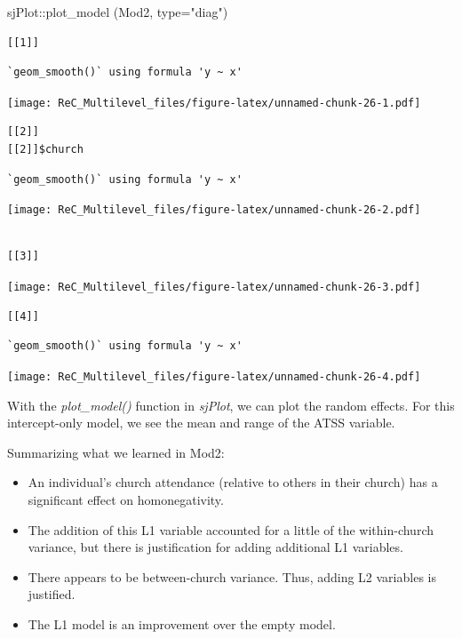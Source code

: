 \documentclass[
  11pt,
]{book}
\newenvironment{Shaded}{\begin{snugshade}}{\end{snugshade}}
\newcommand{\AttributeTok}[1]{\textcolor[rgb]{0.77,0.63,0.00}{#1}}
\newcommand{\FunctionTok}[1]{\textcolor[rgb]{0.00,0.00,0.00}{#1}}
\newcommand{\NormalTok}[1]{#1}
\newcommand{\SpecialCharTok}[1]{\textcolor[rgb]{0.00,0.00,0.00}{#1}}
\newcommand{\StringTok}[1]{\textcolor[rgb]{0.31,0.60,0.02}{#1}}
\providecommand{\tightlist}{%
  \setlength{\itemsep}{0pt}\setlength{\parskip}{0pt}}
\begin{document}
\begin{Shaded}
\begin{Highlighting}[]
\NormalTok{sjPlot}\SpecialCharTok{::}\FunctionTok{plot\_model}\NormalTok{ (Mod2, }\AttributeTok{type=}\StringTok{"diag"}\NormalTok{)}
\end{Highlighting}
\end{Shaded}

\begin{verbatim}
[[1]]
\end{verbatim}

\begin{verbatim}
`geom_smooth()` using formula 'y ~ x'
\end{verbatim}

\texttt{[image: ReC\_Multilevel\_files/figure-latex/unnamed-chunk-26-1.pdf]}

\begin{verbatim}
[[2]]
[[2]]$church
\end{verbatim}

\begin{verbatim}
`geom_smooth()` using formula 'y ~ x'
\end{verbatim}

\texttt{[image: ReC\_Multilevel\_files/figure-latex/unnamed-chunk-26-2.pdf]}

\begin{verbatim}

[[3]]
\end{verbatim}

\texttt{[image: ReC\_Multilevel\_files/figure-latex/unnamed-chunk-26-3.pdf]}

\begin{verbatim}
[[4]]
\end{verbatim}

\begin{verbatim}
`geom_smooth()` using formula 'y ~ x'
\end{verbatim}

\texttt{[image: ReC\_Multilevel\_files/figure-latex/unnamed-chunk-26-4.pdf]}

With the \emph{plot\_model()} function in \emph{sjPlot}, we can plot the random effects. For this intercept-only model, we see the mean and range of the ATSS variable.

Summarizing what we learned in Mod2:

\begin{itemize}
\tightlist
\item
  An individual's church attendance (relative to others in their church) has a significant effect on homonegativity.
\item
  The addition of this L1 variable accounted for a little of the within-church variance, but there is justification for adding additional L1 variables.
\item
  There appears to be between-church variance. Thus, adding L2 variables is justified.
\item
  The L1 model is an improvement over the empty model.
\end{itemize}
\end{document}
